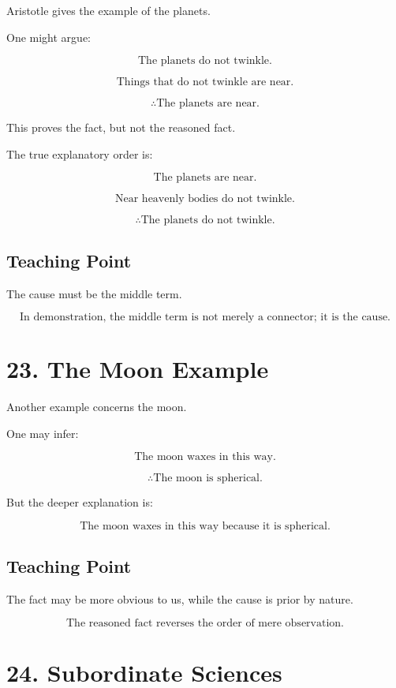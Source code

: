 \documentclass[12pt]{article}
\begin{document}
Aristotle gives the example of the planets.

One might argue:

\[
\text{The planets do not twinkle.}
\]

\[
\text{Things that do not twinkle are near.}
\]

\[
\therefore \text{The planets are near.}
\]

This proves the fact, but not the reasoned fact.

The true explanatory order is:

\[
\text{The planets are near.}
\]

\[
\text{Near heavenly bodies do not twinkle.}
\]

\[
\therefore \text{The planets do not twinkle.}
\]

\subsection*{Teaching Point}

The cause must be the middle term.

\[
\boxed{
\text{In demonstration, the middle term is not merely a connector; it is the cause.}
}
\]

\section*{23. The Moon Example}

Another example concerns the moon.

One may infer:

\[
\text{The moon waxes in this way.}
\]

\[
\therefore \text{The moon is spherical.}
\]

But the deeper explanation is:

\[
\text{The moon waxes in this way because it is spherical.}
\]

\subsection*{Teaching Point}

The fact may be more obvious to us, while the cause is prior by nature.

\[
\boxed{
\text{The reasoned fact reverses the order of mere observation.}
}
\]

\section*{24. Subordinate Sciences}
\end{document}
